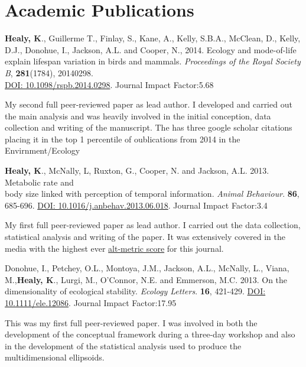 \documentclass[10pt,a4paper]{article}
\begin{document}
\section{Academic Publications}
\begin{flushleft}
\textbf{Healy, K}., Guillerme T., Finlay, S., Kane, A., Kelly, S.B.A., McClean, D., Kelly, D.J., Donohue, I., Jackson, A.L. and Cooper, N., 2014. Ecology and mode-of-life explain lifespan variation in birds and mammals. \textit{Proceedings of the Royal Society B}, \textbf{281}(1784), 20140298.\\ \href{http://rspb.royalsocietypublishing.org/content/281/1784/20140298.full.pdf?keytype=ref&ijkey=gPt28ElSAYBvRhZ}{DOI: 10.1098/rspb.2014.0298}. Journal Impact Factor:5.68
\smallskip
\par{\fontsize{10.5}{10}\selectfont My second full peer-reviewed paper as lead author. I developed and carried out the main analysis and was heavily involved in the initial conception, data collection and writing of the manuscript. The has three google scholar citations placing it in the top 1 percentile of oublications from 2014 in the Envirnment/Ecology }

\bigskip

\textbf{Healy, K}., McNally, L, Ruxton, G., Cooper, N. and Jackson, A.L. 2013. Metabolic rate and\\
body size linked with perception of temporal information.  \textit{Animal Behaviour}. \textbf{86}, 685-696. \href{http://dx.doi.org/10.1016/j.anbehav.2013.06.018}{DOI: 10.1016/j.anbehav.2013.06.018}. Journal Impact Factor:3.4
\smallskip
\par{\fontsize{10.5}{10}\selectfont My first full peer-reviewed paper as lead author. I carried out the data collection, statistical analysis and writing of the paper. It was extensively covered in the media with the highest ever \href{http://www.altmetric.com/details.php?key=517059da36b98ab7d4941284da32e5f7&citation_id=1705703&embedded=true}{alt-metric score} for this journal.} %

\bigskip

\setlength{\parindent}{0mm}Donohue, I., Petchey, O.L., Montoya, J.M., Jackson, A.L., McNally, L., Viana, M.,\textbf{Healy, K}., Lurgi, M., O’Connor, N.E. and Emmerson, M.C. 2013. On the dimensionality of ecological stability. \textit{Ecology Letters}. \textbf{16}, 421-429. \href{http://onlinelibrary.wiley.com/doi/10.1111/ele.12086/abstract}{DOI: 10.1111/ele.12086}.  Journal Impact Factor:17.95\\
\smallskip
\par{\fontsize{10.5}{10}\selectfont This was my first full peer-reviewed paper. I was involved in both the development of the conceptual framework during a three-day workshop and also in the development of the statistical analysis used to produce the multidimensional ellipsoids.}
\end{flushleft}
\end{document}

